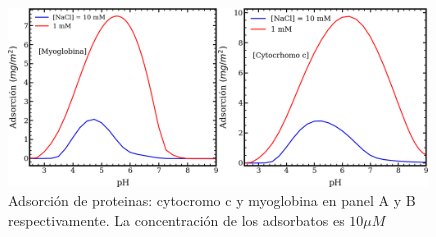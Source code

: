 \begin{figure}
    \centering
    \includegraphics[width=0.99\textwidth]{Figures/graph-film/ad-proteins.png}
    \caption{Adsorci\'on de proteinas: cytocromo c y myoglobina en panel A y B respectivamente. La concentraci\'on de los adsorbatos es $10 \mu M$}
    \label{fig:ad-pro}
\end{figure}
